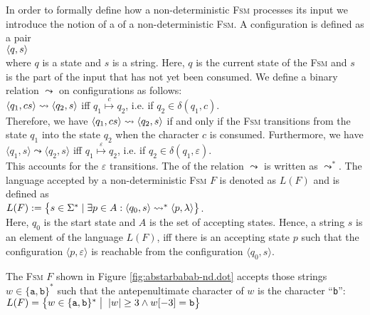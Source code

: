 In order to formally define how a non-deterministic \textsc{Fsm} processes its input we introduce the notion of a
  of a non-deterministic \textsc{Fsm}.  A configuration
is defined as a pair
\\[0.2cm]
\hspace*{1.3cm}
$\pair(q, s)$
\\[0.2cm]
where  $q$ is a state and $s$ is a  string.  Here, $q$ is the current state of
the \textsc{Fsm} and $s$ is the part of the input that has not yet been
consumed.  We define a binary relation
$\leadsto$ \index{$\leadsto$} on configurations as follows:
\\[0.2cm]
\hspace*{1.3cm}
$\pair(q_1, cs) \leadsto \pair(q_2, s)$ \quad iff \quad $q_1 \stackrel{c}{\mapsto} q_2$, \quad i.e. if $q_2 \in\delta(q_1, c)$.
\\[0.2cm]
Therefore, we have $\pair(q_1,cs) \leadsto \pair(q_2, s)$ if and only
if the \textsc{Fsm} transitions from the state
$q_1$ into the state $q_2$ when the character $c$ is consumed.
Furthermore, we have
\\[0.2cm]
\hspace*{1.3cm}
$\langle q_1, s \rangle \leadsto \langle q_2, s \rangle$ \quad iff \quad $q_1 \stackrel{\varepsilon}{\mapsto}
q_2$, \quad i.e. if $q_2 \in \delta(q_1, \varepsilon)$.
\\[0.2cm]
This accounts for the $\varepsilon$ transitions.  The
 of the relation $\leadsto$ is written as $\leadsto^*$.
The language accepted by a non-deterministic \textsc{Fsm} $F$ is
denoted as $L(F)$ and is defined as
\\[0.2cm]
\hspace*{1.3cm}
$L(F) := \bigl\{ s \in \Sigma^* \mid  
                 \exists p \in A : \pair(q_0,s) \leadsto^* \pair(p,\lambda) \bigr\}$.
\\[0.2cm]
Here,  $q_0$ is the  start state and $A$ is the set of accepting
states.  Hence, a string  $s$ is an element of the language  $L(F)$,  
iff there is an accepting state $p$ such that the configuration $\langle p, \varepsilon \rangle$ is reachable from the configuration $\langle q_0, s \rangle$.

\exampleEng 
The \textsc{Fsm} $F$ shown in Figure \ref{fig:abstarbabab-nd.dot} accepts
those strings $w \in \{ \mathtt{a}, \mathtt{b} \}^*$ such that the
antepenultimate character of $w$ is  the character ``\texttt{b}'':
\\[0.2cm]
\hspace*{1.3cm}
$L(F) = \bigl\{ w \in \{ \mathtt{a}, \mathtt{b} \}^* \bigm|\; |w| \geq 3 \wedge w[-3] = \mathtt{b} \bigr\}$
 \eox
\vspace*{0.3cm}

